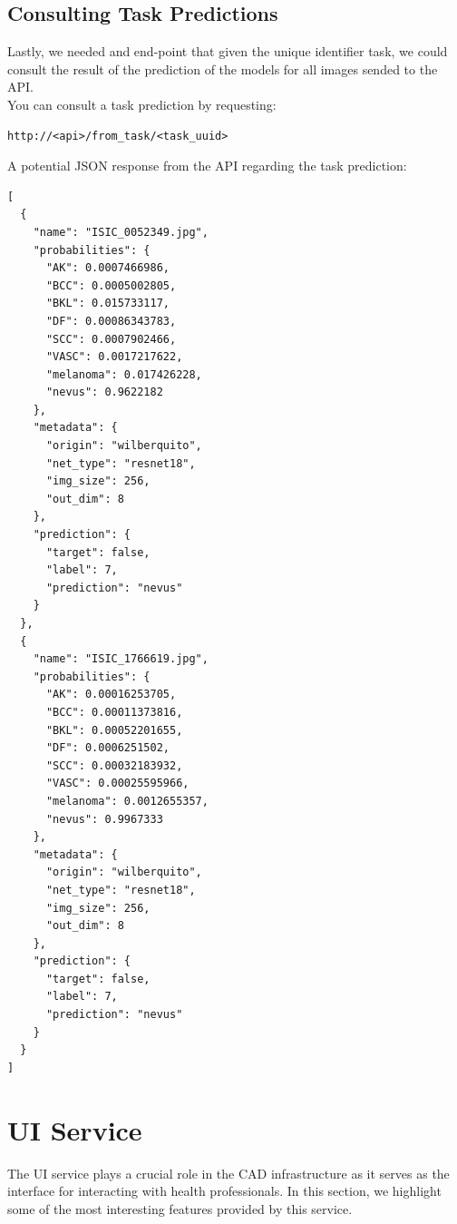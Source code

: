 \subsection{Consulting Task Predictions}

Lastly, we needed and end-point that given the unique identifier task,
we could consult the result of the prediction of the models for all images
sended to the API. \\

You can consult a task prediction by requesting:

\begin{Verbatim}[fontsize=\scriptsize]
http://<api>/from_task/<task_uuid>
\end{Verbatim}

A potential JSON response from the API regarding the task prediction:

\begin{Verbatim}[fontsize=\scriptsize]
[
  {
    "name": "ISIC_0052349.jpg",
    "probabilities": {
      "AK": 0.0007466986,
      "BCC": 0.0005002805,
      "BKL": 0.015733117,
      "DF": 0.00086343783,
      "SCC": 0.0007902466,
      "VASC": 0.0017217622,
      "melanoma": 0.017426228,
      "nevus": 0.9622182
    },
    "metadata": {
      "origin": "wilberquito",
      "net_type": "resnet18",
      "img_size": 256,
      "out_dim": 8
    },
    "prediction": {
      "target": false,
      "label": 7,
      "prediction": "nevus"
    }
  },
  {
    "name": "ISIC_1766619.jpg",
    "probabilities": {
      "AK": 0.00016253705,
      "BCC": 0.00011373816,
      "BKL": 0.00052201655,
      "DF": 0.0006251502,
      "SCC": 0.00032183932,
      "VASC": 0.00025595966,
      "melanoma": 0.0012655357,
      "nevus": 0.9967333
    },
    "metadata": {
      "origin": "wilberquito",
      "net_type": "resnet18",
      "img_size": 256,
      "out_dim": 8
    },
    "prediction": {
      "target": false,
      "label": 7,
      "prediction": "nevus"
    }
  }
]
\end{Verbatim}

\section{UI Service}

The UI service plays a crucial role in the CAD infrastructure as it serves as
the interface for interacting with health professionals. In this section, we
highlight some of the most interesting features provided by this service. \\

